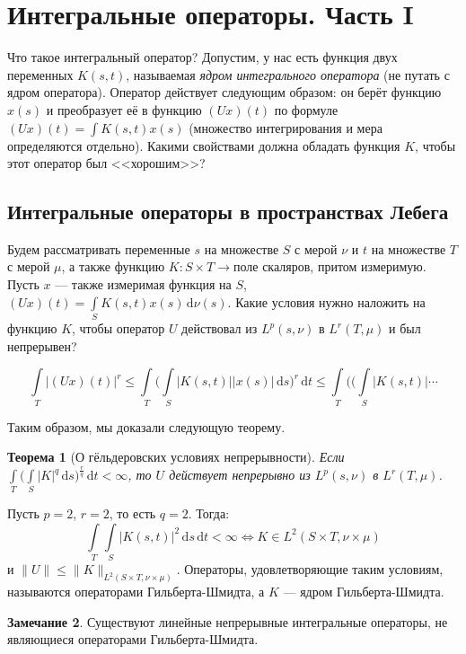 \documentclass[11pt,openany,a4paper]{scrartcl}
\theoremstyle{plain}
\newtheorem{theorem}{Теорема}[section]
\theoremstyle{definition}
\newtheorem{remark}[theorem]{Замечание}
\newcommand{\dif}{\, \mathrm d}
\begin{document}
\section{Интегральные операторы. Часть I}

Что такое интегральный оператор? Допустим, у нас есть функция двух переменных
$K(s, t)$, называемая \emph{ядром интегрального оператора} (не путать с ядром
оператора). Оператор действует следующим образом: он берёт функцию $x(s)$ и
преобразует её в функцию $(Ux)(t)$ по формуле
$(Ux)(t) = \int K(s, t) x(s)$ (множество интегрирования и мера определяются 
отдельно). Какими свойствами должна обладать функция $K$,
чтобы этот оператор был <<хорошим>>?

\subsection{Интегральные операторы в пространствах Лебега}

Будем рассматривать переменные $s$ на множестве $S$ с мерой $\nu$ и $t$
на множестве $T$ с мерой $\mu$, а также функцию
$K: S \times T \to \text{поле скаляров}$, притом измеримую. Пусть $x$ — также
измеримая функция на $S$, $(Ux)(t) = \int\limits_S K(s, t)x(s)\dif \nu(s)$.
Какие условия нужно наложить на функцию $K$, чтобы оператор $U$ действовал из
$L^p(s, \nu)$ в $L^r(T, \mu)$ и был непрерывен?

$$
\int\limits_T |(Ux)(t)|^r \leqslant \int\limits_T
\bigg(\int\limits_S|K(s, t)||x(s)|\dif s\bigg)^r \dif t \leqslant
\int\limits_T\bigg(\bigg(\int\limits_S |K(s, t)| \cdots
$$

Таким образом, мы доказали следующую теорему.

\begin{theorem}[О гёльдеровских условиях непрерывности]
    Если $\int\limits_T\bigg(\int\limits_S |K|^q \dif s\bigg)^\frac{r}{q} \dif t
    < \infty$, то $U$ действует непрерывно из $L^p(s, \nu)$ в $L^r(T, \mu)$.
\end{theorem}

Пусть $p = 2$, $r = 2$, то есть $q = 2$. Тогда:
$$
\int\limits_T \int\limits_S |K(s, t)|^2 \dif s \dif t < \infty \iff
K \in L^2(S\times T, \nu \times \mu)
$$
и $\|U\|\leqslant \|K\|_{L^2(S\times T, \nu\times \mu)}$. Операторы, 
удовлетворяющие таким условиям, называются операторами Гильберта-Шмидта, а
$K$ — ядром Гильберта-Шмидта.
\begin{remark}
    Существуют линейные непрерывные интегральные операторы, не являющиеся
    операторами Гильберта-Шмидта.
\end{remark}
\end{document}
